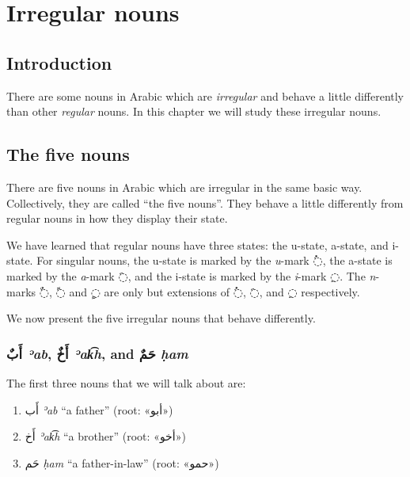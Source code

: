 \documentclass[
  10pt,
]{book}
\providecommand{\tightlist}{%
  \setlength{\itemsep}{0pt}\setlength{\parskip}{0pt}}
\begin{document}
\chapter{Irregular nouns}\label{irregular-nouns}

\section{Introduction}\label{introduction-11}

There are some nouns in Arabic which are \emph{irregular} and behave a little differently than other \emph{regular} nouns. In this chapter we will study these irregular nouns.

\section{The five nouns}\label{the-five-nouns}

There are five nouns in Arabic which are irregular in the same basic way. Collectively, they are called \enquote{the five nouns}.
They behave a little differently from regular nouns in how they display their state.

We have learned that regular nouns have three states: the u-state, a-state, and i-state. For singular nouns, the u-state is marked by the \emph{u}-mark \foreignlanguage{arabic}{◌ُ}, the a-state is marked by the \emph{a}-mark \foreignlanguage{arabic}{◌َ}, and the i-state is marked by the \emph{i}-mark \foreignlanguage{arabic}{◌ِ}. The \emph{n}-marks \foreignlanguage{arabic}{◌ٌ}, \foreignlanguage{arabic}{◌ً} and \foreignlanguage{arabic}{◌ٍ} are only but extensions of \foreignlanguage{arabic}{◌ُ}, \foreignlanguage{arabic}{◌َ}, and \foreignlanguage{arabic}{◌ِ} respectively.

We now present the five irregular nouns that behave differently.

\subsection{\texorpdfstring{\foreignlanguage{arabic}{أَبٌ} \emph{ʾab}, \foreignlanguage{arabic}{أَخٌ} \emph{ʾak͡h}, and \foreignlanguage{arabic}{حَمٌ} \emph{ḥam}}{أَبٌ ʾab, أَخٌ ʾak͡h, and حَمٌ ḥam}}\label{ux623ux628-eab-ux623ux62e-eax-and-ux62dux645-ham}

The first three nouns that we will talk about are:

\begin{enumerate}
\def\labelenumi{\roman{enumi}.}
\tightlist
\item
  \foreignlanguage{arabic}{أَب} \emph{ʾab} \enquote{a father} (root: \foreignlanguage{arabic}{«أبو»})
\item
  \foreignlanguage{arabic}{أَخ} \emph{ʾak͡h} \enquote{a brother} (root: \foreignlanguage{arabic}{«أخو»})
\item
  \foreignlanguage{arabic}{حَم} \emph{ḥam} \enquote{a father-in-law} (root: \foreignlanguage{arabic}{«حمو»})
\end{enumerate}
\end{document}
